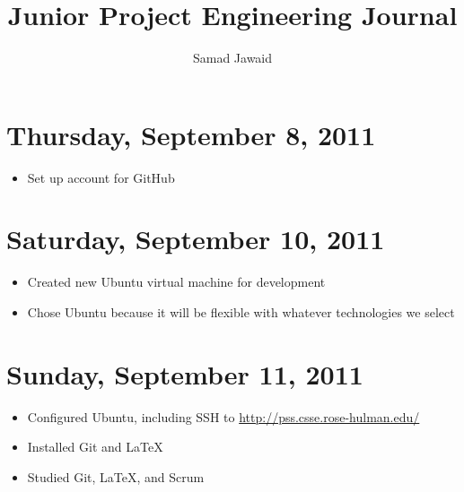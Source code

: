 \documentclass{article}
\title{Junior Project Engineering Journal}
\author{Samad Jawaid}
\begin{document}
\maketitle

\section{Thursday, September 8, 2011}
\begin{itemize}
\item Set up account for GitHub
\end{itemize}

\section{Saturday, September 10, 2011}
\begin{itemize}
\item Created new Ubuntu virtual machine for development
\item Chose Ubuntu because it will be flexible with whatever technologies we select
\end{itemize}

\section{Sunday, September 11, 2011}
\begin{itemize}
\item Configured Ubuntu, including SSH to \url{http://pss.csse.rose-hulman.edu/}
\item Installed Git and \LaTeX
\item Studied Git, \LaTeX, and Scrum
\end{itemize}
\end{document}
